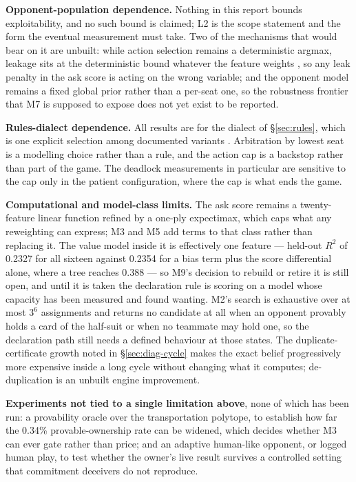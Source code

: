 \documentclass[11pt]{article}
\theoremstyle{definition}
\providecommand{\numProvableOwn}{0.34}
\providecommand{\numValueRSq}{0.2327}
\providecommand{\numValueRSqScore}{0.2354}
\providecommand{\numValueRSqTree}{0.388}
\begin{document}
\textbf{Opponent-population dependence.} Nothing in this report bounds
exploitability, and no such bound is claimed; L2 is the scope statement and
\cite{lisy-lbr} the form the eventual measurement must take. Two of the
mechanisms that would bear on it are unbuilt: while action selection remains a
deterministic argmax, leakage sits at the deterministic bound whatever the
feature weights \cite{alvim-leakage}, so any leak penalty in the ask score is
acting on the wrong variable; and the opponent model remains a fixed global
prior rather than a per-seat one, so the robustness frontier that M7 is supposed
to expose does not yet exist to be reported.

\textbf{Rules-dialect dependence.} All results are for the dialect of
\S\ref{sec:rules}, which is one explicit selection among documented variants
\cite{pagat}. Arbitration by lowest seat is a modelling choice rather than a
rule, and the action cap is a backstop rather than part of the game. The
deadlock measurements in particular are sensitive to the cap only in the patient
configuration, where the cap is what ends the game.

\textbf{Computational and model-class limits.} The ask score remains a
twenty-feature linear function refined by a one-ply expectimax, which caps what
any reweighting can express; M3 and M5 add terms to that class rather than
replacing it. The value model inside it is effectively one feature --- held-out
$R^2$ of \numValueRSq{} for all sixteen against \numValueRSqScore{} for a bias
term plus the score differential alone, where a tree reaches \numValueRSqTree{}
--- so M9's decision to rebuild or retire it is still open, and until it is
taken the declaration rule is scoring on a model whose capacity has been
measured and found wanting. M2's search is exhaustive over at most $3^6$
assignments and returns no candidate at all when an opponent provably holds a
card of the half-suit or when no teammate may hold one, so the declaration path
still needs a defined behaviour at those states. The duplicate-certificate growth
noted in \S\ref{sec:diag-cycle} makes the exact belief progressively more
expensive inside a long cycle without changing what it computes; de-duplication
is an unbuilt engine improvement.

\textbf{Experiments not tied to a single limitation above}, none of which has
been run: a provability oracle over the transportation polytope, to establish how
far the \numProvableOwn\% provable-ownership rate can be widened, which decides
whether M3 can ever gate rather than price; and an adaptive human-like opponent,
or logged human play, to test whether the owner's live result survives a
controlled setting that commitment deceivers do not reproduce.
\end{document}
